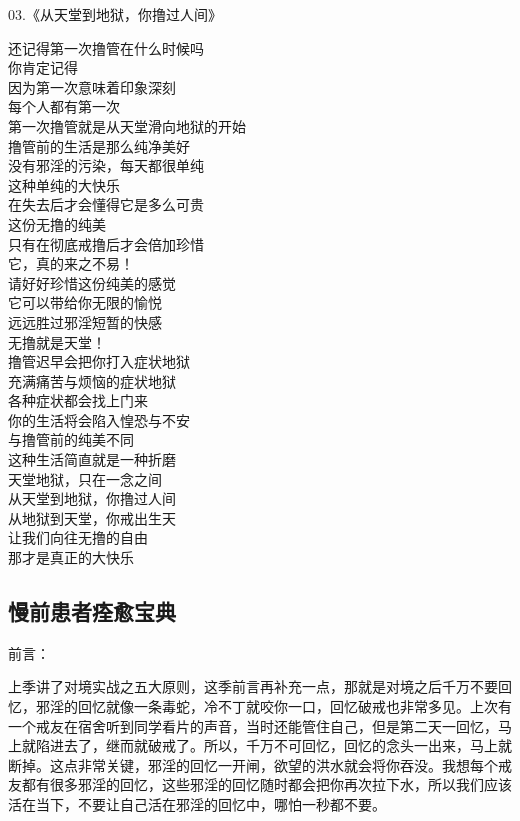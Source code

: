 \begin{center}
    03.《从天堂到地狱，你撸过人间》\it
    \begin{multicols}{2}
        还记得第一次撸管在什么时候吗 \\ 你肯定记得 \\ 因为第一次意味着印象深刻 \\ 每个人都有第一次 \\ 第一次撸管就是从天堂滑向地狱的开始 \\ 撸管前的生活是那么纯净美好 \\ 没有邪淫的污染，每天都很单纯 \\ 这种单纯的大快乐 \\ 在失去后才会懂得它是多么可贵 \\ 这份无撸的纯美 \\ 只有在彻底戒撸后才会倍加珍惜 \\ 它，真的来之不易！ \\ 请好好珍惜这份纯美的感觉 \\ 它可以带给你无限的愉悦 \\ 远远胜过邪淫短暂的快感 \\ 无撸就是天堂！ \\ 撸管迟早会把你打入症状地狱 \\ 充满痛苦与烦恼的症状地狱 \\ 各种症状都会找上门来 \\ 你的生活将会陷入惶恐与不安 \\ 与撸管前的纯美不同 \\ 这种生活简直就是一种折磨 \\ 天堂地狱，只在一念之间 \\ 从天堂到地狱，你撸过人间 \\ 从地狱到天堂，你戒出生天 \\ 让我们向往无撸的自由 \\ 那才是真正的大快乐
    \end{multicols}
\end{center}

\subsection{慢前患者痊愈宝典}

前言：

上季讲了对境实战之五大原则，这季前言再补充一点，那就是对境之后千万不要回忆，邪淫的回忆就像一条毒蛇，冷不丁就咬你一口，回忆破戒也非常多见。上次有一个戒友在宿舍听到同学看片的声音，当时还能管住自己，但是第二天一回忆，马上就陷进去了，继而就破戒了。所以，千万不可回忆，回忆的念头一出来，马上就断掉。这点非常关键，邪淫的回忆一开闸，欲望的洪水就会将你吞没。我想每个戒友都有很多邪淫的回忆，这些邪淫的回忆随时都会把你再次拉下水，所以我们应该活在当下，不要让自己活在邪淫的回忆中，哪怕一秒都不要。

